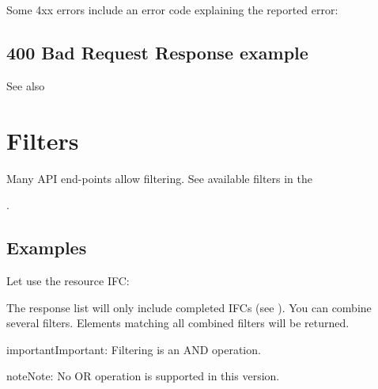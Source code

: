 \documentclass[a4paper,12pt,english]{sphinxmanual}
\begin{document}
Some 4xx errors include an error code explaining the reported error:


\subsection{400 Bad Request Response example}
\label{\detokenize{guide/errors:bad-request-response-example}}
%
\begin{sphinxVerbatim}[commandchars=\\\{\}]
     \PYG{p}{[}
    \PYG{p}{]}
\end{sphinxVerbatim}




See also {\hyperref[\detokenize{api/introduction::doc}]{}}




\section{Filters}
\label{\detokenize{guide/filters:filters}}\label{\detokenize{guide/filters::doc}}
Many API end-points allow filtering.
See available filters in the %
\begin{footnote}[7]\sphinxAtStartFootnote
{}
%
\end{footnote}.


\subsection{Examples}
\label{\detokenize{guide/filters:examples}}
Let use the resource IFC: 

The response list will only include completed IFCs (see {\hyperref[\detokenize{concepts/ifc::doc}]{}}).
You can combine several filters. Elements matching all combined filters will be returned.

\begin{sphinxadmonition}{important}{Important:}
Filtering is an AND operation.
\end{sphinxadmonition}

\begin{sphinxadmonition}{note}{Note:}
No OR operation is supported in this version.
\end{sphinxadmonition}
\end{document}
